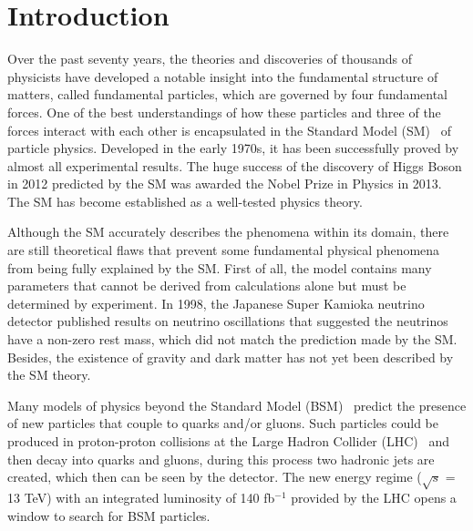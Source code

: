 \documentclass[UTF8,12pt]{ctexart}
\numberwithin{equation}{section}
\renewcommand{\rm}{\mathrm}
\def\ifb{fb$^{-1}$ }
\begin{document}

\renewcommand\contentsname{\textbf{Contents}}


\tableofcontents\thispagestyle{fancy}





\newpage
{}

\pagestyle{fancy}
\fancyhf{}
\cfoot{$\bm{-\thepage-}$}




\section{Introduction}
\label{sec:1}


\hspace{8mm}
Over the past seventy years, the theories and discoveries of thousands of physicists have developed a notable insight into the fundamental structure of matters, called fundamental particles, which are governed by four fundamental forces. One of the best understandings of how these particles and three of the forces interact with each other is encapsulated in the Standard Model (SM)~\cite{ref1,ref8} of particle physics. Developed in the early 1970s, it has been successfully proved by almost all experimental results. The huge success of the discovery of Higgs Boson in 2012 predicted by the SM was awarded the Nobel Prize in Physics in 2013. The SM has become established as a well-tested physics theory.

Although the SM accurately describes the phenomena within its domain, there are still theoretical flaws that prevent some fundamental physical phenomena from being fully explained by the SM. First of all, the model contains many parameters that cannot be derived from calculations alone but must be determined by experiment. 
In 1998, the Japanese Super Kamioka neutrino detector published results on neutrino oscillations that suggested the neutrinos have a non-zero rest mass, which did not match the prediction made by the SM. Besides, the existence of gravity and dark matter has not yet been described by the SM theory.

Many models of physics beyond the Standard Model (BSM)~\cite{ref9} predict the presence of new particles that couple to quarks and/or gluons. Such particles could be produced in proton-proton collisions at the Large Hadron Collider (LHC)~\cite{Evans:2008zzb} and then decay into quarks and gluons, during this process two hadronic jets are created, which then can be seen by the detector. The new energy regime ($\sqrt{s}$ = 13 TeV) with an integrated luminosity of 140 \ifb provided by the LHC opens a window to search for BSM particles. 
\end{document}

